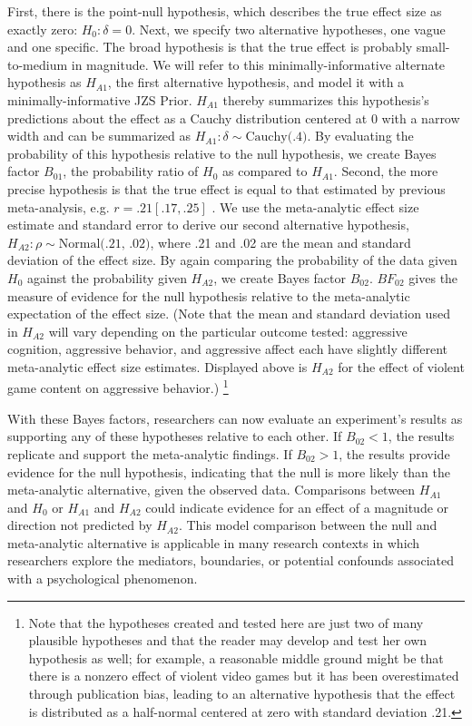 \documentclass[man]{apa6}
\begin{document}
First, there is the point-null hypothesis, which describes the true effect size as exactly zero: $H_0: \delta = 0$. Next, we specify two alternative hypotheses, one vague and one specific. The broad hypothesis is that the true effect is probably small-to-medium in magnitude. We will refer to this minimally-informative alternate hypothesis as $H_{A1}$, the first alternative hypothesis, and model it with a minimally-informative JZS Prior. $H_{A1}$ thereby summarizes this hypothesis's predictions about the effect as a Cauchy distribution centered at 0 with a narrow width and can be summarized as $H_{A1}: \delta{} \sim{} \mbox{Cauchy(.4)}$. By evaluating the probability of this hypothesis relative to the null hypothesis, we create Bayes factor $B_{01}$, the probability ratio of $H_0$ as compared to $H_{A1}$. Second, the more precise hypothesis is that the true effect is equal to that estimated by previous meta-analysis, e.g. $r = .21 [.17, .25]$ \citep{Anderson:etal:2010}.  We use the meta-analytic effect size estimate and standard error to derive our second alternative hypothesis, $H_{A2}: \rho{} \sim{} \mbox{Normal(.21, .02)}$, where .21 and .02 are the mean and standard deviation of the effect size.
By again comparing the probability of the data given $H_0$ against the probability given $H_{A2}$, we create Bayes factor $B_{02}$. $BF_{02}$ gives the measure of evidence for the null hypothesis relative to the meta-analytic expectation of the effect size. (Note that the mean and standard deviation used in $H_{A2}$ will vary depending on the particular outcome tested: aggressive cognition, aggressive behavior, and aggressive affect each have slightly different meta-analytic effect size estimates. Displayed above is $H_{A2}$ for the effect of violent game content on aggressive behavior.) \footnote{Note that the hypotheses created and tested here are just two of many plausible hypotheses and that the reader may develop and test her own hypothesis as well; for example, a reasonable middle ground might be that there is a nonzero effect of violent video games but it has been overestimated through publication bias, leading to an alternative hypothesis that the effect is distributed as a half-normal centered at zero with standard deviation .21.} 

With these Bayes factors, researchers can now evaluate an experiment's results as supporting any of these hypotheses relative to each other. If $B_{02} < 1$, the results replicate and support the meta-analytic findings. If $B_{02} > 1$, the results provide evidence for the null hypothesis, indicating that the null is more likely than the meta-analytic alternative, given the observed data.  Comparisons between $H_{A1}$ and $H_0$ or $H_{A1}$ and $H_{A2}$ could indicate evidence for an effect of a magnitude or direction not predicted by $H_{A2}$. This model comparison between the null and meta-analytic alternative is applicable in many research contexts in which researchers explore the mediators, boundaries, or potential confounds associated with a psychological phenomenon.
\end{document}

